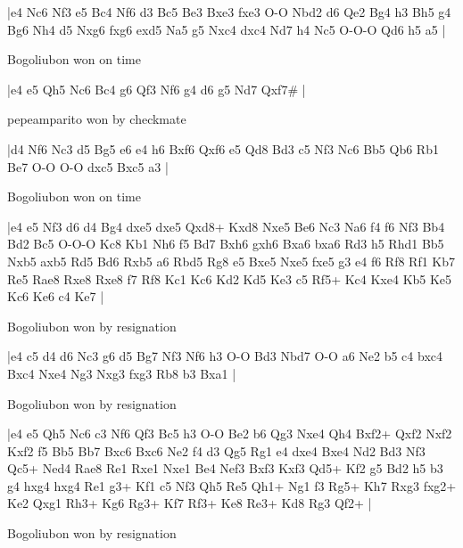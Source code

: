 \makegametitle
|e4 Nc6 Nf3 e5 Bc4 Nf6 d3 Bc5 Be3 Bxe3 fxe3 O-O Nbd2 d6 Qe2 Bg4 h3 Bh5 g4 Bg6 Nh4 d5 Nxg6 fxg6 exd5 Na5 g5 Nxc4 dxc4 Nd7 h4 Nc5 O-O-O Qd6 h5 a5  |

\showboard

Bogoliubon won on time

\makegametitle
|e4 e5 Qh5 Nc6 Bc4 g6 Qf3 Nf6 g4 d6 g5 Nd7 Qxf7\#  |

\showboard

pepeamparito won by checkmate

\makegametitle
|d4 Nf6 Nc3 d5 Bg5 e6 e4 h6 Bxf6 Qxf6 e5 Qd8 Bd3 c5 Nf3 Nc6 Bb5 Qb6 Rb1 Be7 O-O O-O dxc5 Bxc5 a3  |

\showboard

Bogoliubon won on time

\makegametitle
|e4 e5 Nf3 d6 d4 Bg4 dxe5 dxe5 Qxd8+ Kxd8 Nxe5 Be6 Nc3 Na6 f4 f6 Nf3 Bb4 Bd2 Bc5 O-O-O Kc8 Kb1 Nh6 f5 Bd7 Bxh6 gxh6 Bxa6 bxa6 Rd3 h5 Rhd1 Bb5 Nxb5 axb5 Rd5 Bd6 Rxb5 a6 Rbd5 Rg8 e5 Bxe5 Nxe5 fxe5 g3 e4 f6 Rf8 Rf1 Kb7 Re5 Rae8 Rxe8 Rxe8 f7 Rf8 Kc1 Kc6 Kd2 Kd5 Ke3 c5 Rf5+ Kc4 Kxe4 Kb5 Ke5 Kc6 Ke6 c4 Ke7  |

\showboard

Bogoliubon won by resignation

\makegametitle
|e4 c5 d4 d6 Nc3 g6 d5 Bg7 Nf3 Nf6 h3 O-O Bd3 Nbd7 O-O a6 Ne2 b5 c4 bxc4 Bxc4 Nxe4 Ng3 Nxg3 fxg3 Rb8 b3 Bxa1  |

\showboard

Bogoliubon won by resignation

\makegametitle
|e4 e5 Qh5 Nc6 c3 Nf6 Qf3 Bc5 h3 O-O Be2 b6 Qg3 Nxe4 Qh4 Bxf2+ Qxf2 Nxf2 Kxf2 f5 Bb5 Bb7 Bxc6 Bxc6 Ne2 f4 d3 Qg5 Rg1 e4 dxe4 Bxe4 Nd2 Bd3 Nf3 Qc5+ Ned4 Rae8 Re1 Rxe1 Nxe1 Be4 Nef3 Bxf3 Kxf3 Qd5+ Kf2 g5 Bd2 h5 b3 g4 hxg4 hxg4 Re1 g3+ Kf1 c5 Nf3 Qh5 Re5 Qh1+ Ng1 f3 Rg5+ Kh7 Rxg3 fxg2+ Ke2 Qxg1 Rh3+ Kg6 Rg3+ Kf7 Rf3+ Ke8 Re3+ Kd8 Rg3 Qf2+  |

\showboard

Bogoliubon won by resignation

